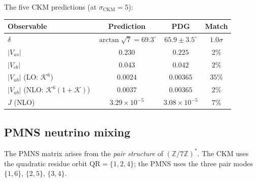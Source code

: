The five CKM predictions (at $\sigma_{\mathrm{CKM}} = 5$):
\begin{center}\small
\begin{tabular}{lccc}
\toprule
Observable & Prediction & PDG & Match \\
\midrule
$\delta$ & $\arctan\sqrt{7} = 69.3^\circ$ & $65.9 \pm 3.5^\circ$ & $1.0\sigma$ \\
$|V_{us}|$ & $0.230$ & $0.225$ & $2\%$ \\
$|V_{cb}|$ & $0.043$ & $0.042$ & $2\%$ \\
$|V_{ub}|$ (LO: $\mathcal{K}^6$) & $0.0024$ & $0.00365$ & $35\%$ \\
$|V_{ub}|$ (NLO: $\mathcal{K}^6(1{+}\mathcal{K})$) & $0.0037$ & $0.00365$ & $2\%$ \\
$J$ (NLO) & $3.29 \times 10^{-5}$ & $3.08 \times 10^{-5}$ & $7\%$ \\
\bottomrule
\end{tabular}
\end{center}

\subsection{PMNS neutrino mixing}
\label{sec:pmns}

The PMNS matrix arises from the \emph{pair structure}
of $(\mathbb{Z}/7\mathbb{Z})^*$.
The CKM uses the quadratic residue orbit
$\mathrm{QR} = \{1,2,4\}$;
the PMNS uses the three pair modes
$\{1,6\}$, $\{2,5\}$, $\{3,4\}$.

